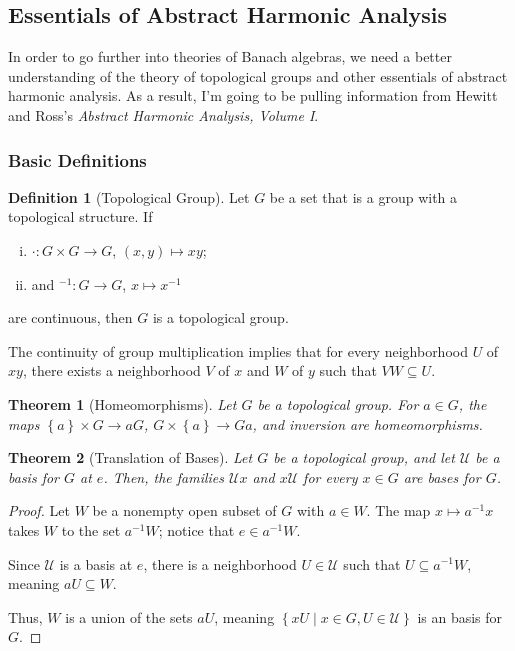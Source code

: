 \documentclass[10pt]{extarticle}
\newcommand{\set}[1]{\left\{#1\right\}}
\theoremstyle{plain}
\newtheorem*{theorem}{Theorem}
\theoremstyle{definition}
\newtheorem*{definition}{Definition}
\theoremstyle{note}
\renewcommand{\newline}{\hfill\break}
\begin{document}
\subsection{Essentials of Abstract Harmonic Analysis}%
In order to go further into theories of Banach algebras, we need a better understanding of the theory of topological groups and other essentials of abstract harmonic analysis. As a result, I'm going to be pulling information from Hewitt and Ross's \textit{Abstract Harmonic Analysis, Volume I}.
\subsubsection{Basic Definitions}%
\begin{definition}[Topological Group]
Let $G$ be a set that is a group with a topological structure. If
\begin{enumerate}[(i)]
  \item $\cdot: G\times G \rightarrow G$, $(x,y) \mapsto xy$;
  \item and $^{-1}: G\rightarrow G$, $x\mapsto x^{-1}$
\end{enumerate}
are continuous, then $G$ is a topological group.
\end{definition}
The continuity of group multiplication implies that for every neighborhood $U$ of $xy$, there exists a neighborhood $V$ of $x$ and $W$ of $y$ such that $VW \subseteq U$.
\begin{theorem}[Homeomorphisms]
  Let $G$ be a topological group. For $a\in G$, the maps $\set{a}\times G \rightarrow aG$, $G\times \set{a}\rightarrow Ga$, and inversion are homeomorphisms.
\end{theorem}
\begin{theorem}[Translation of Bases]
  Let $G$ be a topological group, and let $\mathcal{U}$ be a basis for $G$ at $e$. Then, the families $\mathcal{U}x$ and $x\mathcal{U}$ for every $x\in G$ are bases for $G$.
\end{theorem}
\begin{proof}
  Let $W$ be a nonempty open subset of $G$ with $a\in W$. The map $x \mapsto a^{-1}x$ takes $W$ to the set $a^{-1}W$; notice that $e\in a^{-1}W$.\newline

  Since $\mathcal{U}$ is a basis at $e$, there is a neighborhood $U\in \mathcal{U}$ such that $U\subseteq a^{-1}W$, meaning $aU\subseteq W$.\newline

  Thus, $W$ is a union of the sets $aU$, meaning $\set{xU\mid x\in G,U\in \mathcal{U}}$ is an basis for $G$.
\end{proof}
\end{document}
